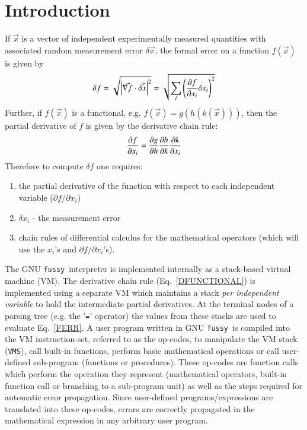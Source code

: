 \documentclass[11pt]{article}
\newcommand{\Fussy}{GNU {\tt fussy}}
\newcommand{\VMS}{{\tt VMS}}
\begin{document}
\newpage
\tableofcontents
\newpage

\section{Introduction}

If $\vec x$ is a vector of independent experimentally measured
quantities with associated random measurement error $\delta \vec
x$, the formal error on a function $f(\vec x)$ is given by
\begin{equation}
  \delta f = \sqrt{\left| \vec{\nabla f} \cdot \vec{\delta x}\right|^2} = \sqrt{\sum_i {\left( {\partial f \over {\partial x_i}} 
        \delta x_i \right)}^2}
\label{FERR}
\end{equation}
Further, if $f(\vec x)$ is a functional, e.g. $f(\vec x)=g(h(k(\vec
x)))$, then the partial derivative of $f$ is given by the derivative
chain rule:
\begin{equation}
{\partial f \over \partial x_i} = {\partial g \over \partial h} 
{\partial h \over \partial k} {\partial k \over \partial x_i}
\label{DFUNCTIONAL}
\end{equation}
Therefore to compute $\delta f$ one requires:
\begin{enumerate}
\item the partial derivative of the function with respect to each
independent variable ($\partial f / \partial x_i$)
\item $\delta x_i$ - the measurement error
\item chain rules of differential calculus for the
mathematical operators (which will use the $x_i$'s and $\partial f /
\partial x_i$'s).  
\end{enumerate}


The \Fussy\ interpreter is implemented internally as a stack-based virtual machine (VM).
The derivative chain rule (Eq.~\ref{DFUNCTIONAL}) is implemented using a separate VM
which maintains a stack {\it per independent variable} to hold the intermediate
partial derivatives.  At the terminal nodes of a parsing tree (e.g.  the '{\tt =}'
operator) the values from these stacks are used to evaluate Eq.~\ref{FERR}.  A user
program written in \Fussy\ is compiled into the VM instruction-set, referred to as the
op-codes, to manipulate the VM stack (\VMS), call built-in functions, perform basic
mathematical operations or call user-defined sub-program (functions or procedures).
These op-codes are function calls which perform the operation they represent
(mathematical operators, built-in function call or branching to a sub-program unit) as
well as the steps required for automatic error propagation.  Since user-defined
programs/expressions are translated into these op-codes, errors are correctly propagated
in the mathematical expression in any arbitrary user program.
\end{document}
